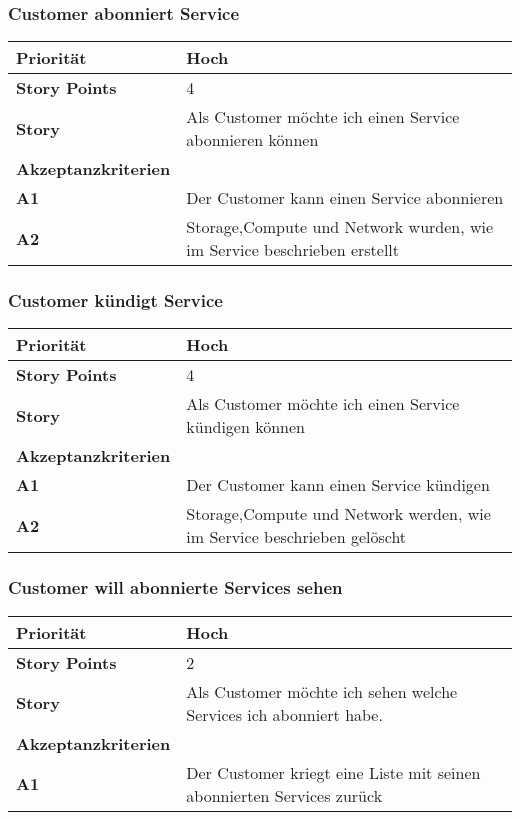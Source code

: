  \subsubsection{Customer abonniert Service}
\begin{tabularx}{\linewidth}{l X}
  \textbf{Priorität} & Hoch\\
  \hline
  \textbf{Story Points} & 4\\
  \hline
  \textbf{Story}& Als Customer möchte ich einen Service abonnieren können\\
  \hline
    \textbf{Akzeptanzkriterien} & \\
    \hline
  \textbf{A1} & Der Customer kann einen Service abonnieren\\
  \hline
    \textbf{A2} & Storage,Compute und Network wurden, wie im Service beschrieben erstellt\\
  \hline  
     \end{tabularx}

 

 \subsubsection{Customer kündigt Service}
 \begin{tabularx}{\linewidth}{l X}
     \textbf{Priorität} & Hoch\\
  \hline
  \textbf{Story Points} & 4\\
  \hline
  \textbf{Story}& Als Customer möchte ich einen Service kündigen können\\
  \hline
    \textbf{Akzeptanzkriterien} & \\
    \hline
  \textbf{A1} & Der Customer kann einen Service kündigen\\
  \hline
    \textbf{A2} & Storage,Compute und Network werden, wie im Service beschrieben gelöscht\\
  \hline
   \end{tabularx}

\subsubsection{Customer will abonnierte Services sehen}
\begin{tabularx}{\linewidth}{l X}
  \textbf{Priorität} & Hoch\\
  \hline
  \textbf{Story Points} & 2\\
  \hline
  \textbf{Story}& Als Customer möchte ich sehen welche Services ich abonniert habe.\\
  \hline
    \textbf{Akzeptanzkriterien} & \\
    \hline
  \textbf{A1} & Der Customer kriegt eine Liste mit seinen abonnierten Services zurück\\
  \hline
   \end{tabularx}
   
